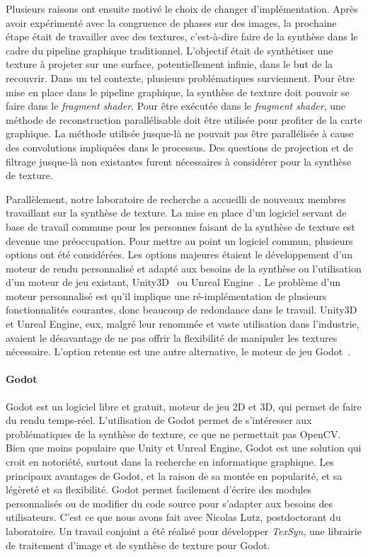 \bigskip

Plusieurs raisons ont ensuite motivé le choix de changer d'implémentation. Après avoir expérimenté avec la congruence de phases sur des images, la prochaine étape était de travailler avec des textures, c'est-à-dire faire de la synthèse dans le cadre du pipeline graphique traditionnel. L'objectif était de synthétiser une texture à projeter sur une surface, potentiellement infinie, dans le but de la recouvrir. Dans un tel contexte, plusieurs problématiques surviennent. Pour être mise en place dans le pipeline graphique, la synthèse de texture doit pouvoir se faire dans le \textit{fragment shader}. Pour être exécutée dans le \textit{fragment shader}, une méthode de reconstruction parallélisable doit être utilisée pour profiter de la carte graphique. La méthode utilisée jusque-là ne pouvait pas être parallélisée à cause des convolutions impliquées dans le processus. Des questions de projection et de filtrage jusque-là non existantes furent nécessaires à considérer pour la synthèse de texture.

\bigskip

Parallèlement, notre laboratoire de recherche a accueilli de nouveaux membres travaillant sur la synthèse de texture. La mise en place d'un logiciel servant de base de travail commune pour les personnes faisant de la synthèse de texture est devenue une préoccupation. Pour mettre au point un logiciel commun, plusieurs options ont été considérées. Les options majeures étaient le développement d'un moteur de rendu personnalisé et adapté aux besoins de la synthèse ou l'utilisation d'un moteur de jeu existant, Unity3D~\cite{unity_engine} ou Unreal Engine~\cite{unreal_engine}. Le problème d'un moteur personnalisé est qu'il implique une ré-implémentation de plusieurs fonctionnalités courantes, donc beaucoup de redondance dans le travail. Unity3D et Unreal Engine, eux, malgré leur renommée et vaste utilisation dans l'industrie, avaient le désavantage de ne pas offrir la flexibilité de manipuler les textures nécessaire. L'option retenue est une autre alternative, le moteur de jeu Godot~\cite{godot_game_engine}.

\paragraph{Godot}

Godot est un logiciel libre et gratuit, moteur de jeu 2D et 3D, qui permet de faire du rendu temps-réel. L'utilisation de Godot permet de s'intéresser aux problématiques de la synthèse de texture, ce que ne permettait pas OpenCV. Bien que moins populaire que Unity et Unreal Engine, Godot est une solution qui croit en notoriété, surtout dans la recherche en informatique graphique. Les principaux avantages de Godot, et la raison de sa montée en popularité, et sa légèreté et sa flexibilité. Godot permet facilement d'écrire des modules personnalisés ou de modifier du code source pour s'adapter aux besoins des utilisateurs. C'est ce que nous avons fait avec Nicolas Lutz, postdoctorant du laboratoire. Un travail conjoint a été réalisé pour développer \textit{TexSyn}, une librairie \cpp de traitement d'image et de synthèse de texture pour Godot.

